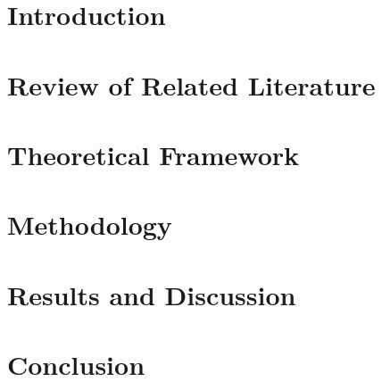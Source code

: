 \begin{SingleSpace}
	\tableofcontents
	\cleardoublepage
	
	\listoffigures
	\cleardoublepage
	
	\listoftables
	\cleardoublepage

\end{SingleSpace}

\DoubleSpacing
\mainmatter

\chapter{Introduction}
\Mprintcontents
	\label{ch:intro}
	
	\clearpage

\chapter{Review of Related Literature} 
\Mprintcontents
	\label{ch:rrl} 
	
	\clearpage

\chapter{Theoretical Framework} 
\Mprintcontents
	\label{ch:theory} 
	
	\clearpage

\chapter{Methodology}
\Mprintcontents
	\label{ch:method}
	
	\stopcontents[chapters]
	\clearpage

%	

\chapter{Results and Discussion}
	\Mprintcontents
	\label{ch:results}
	
	\stopcontents[chapters]
	\clearpage
	
\chapter{Conclusion}
	\Mprintcontents
	\label{ch:conclusion}
	
	\stopcontents[chapters]
	\clearpage

